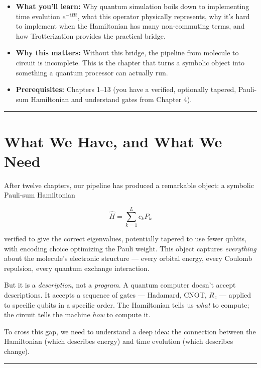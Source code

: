 \documentclass[
  11pt,
  oneside]{book}
\providecommand{\tightlist}{%
  \setlength{\itemsep}{0pt}\setlength{\parskip}{0pt}}
\begin{document}
\begin{itemize}
\tightlist
\item
  \textbf{What you'll learn:} Why quantum simulation boils down to
  implementing time evolution \(e^{-iHt}\), what this operator
  physically represents, why it's hard to implement when the Hamiltonian
  has many non-commuting terms, and how Trotterization provides the
  practical bridge.
\item
  \textbf{Why this matters:} Without this bridge, the pipeline from
  molecule to circuit is incomplete. This is the chapter that turns a
  symbolic object into something a quantum processor can actually run.
\item
  \textbf{Prerequisites:} Chapters 1--13 (you have a verified,
  optionally tapered, Pauli-sum Hamiltonian and understand gates from
  Chapter 4).
\end{itemize}

\begin{center}\rule{0.5\linewidth}{0.5pt}\end{center}

\section{What We Have, and What We
Need}\label{what-we-have-and-what-we-need}

After twelve chapters, our pipeline has produced a remarkable object: a
symbolic Pauli-sum Hamiltonian

\[\hat{H} = \sum_{k=1}^{L} c_k P_k\]

verified to give the correct eigenvalues, potentially tapered to use
fewer qubits, with encoding choice optimizing the Pauli weight. This
object captures \emph{everything} about the molecule's electronic
structure --- every orbital energy, every Coulomb repulsion, every
quantum exchange interaction.

But it is a \emph{description}, not a \emph{program}. A quantum computer
doesn't accept descriptions. It accepts a sequence of gates ---
Hadamard, CNOT, \(R_z\) --- applied to specific qubits in a specific
order. The Hamiltonian tells us \emph{what} to compute; the circuit
tells the machine \emph{how} to compute it.

To cross this gap, we need to understand a deep idea: the connection
between the Hamiltonian (which describes energy) and time evolution
(which describes change).

\begin{center}\rule{0.5\linewidth}{0.5pt}\end{center}
\end{document}
